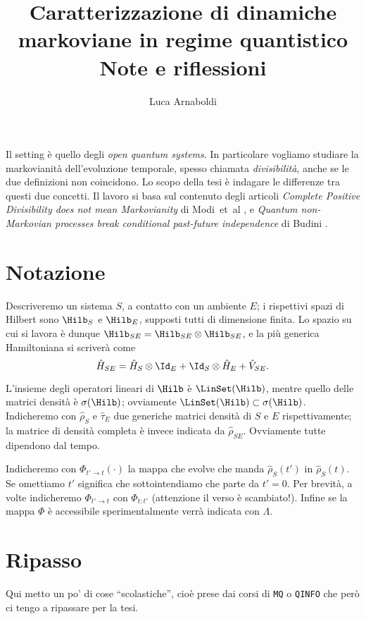 \documentclass[a4]{article}
\title{Caratterizzazione di dinamiche markoviane in regime quantistico \\[1ex]
	   \large{Note e riflessioni}}
\author{Luca Arnaboldi}
\begin{document}
\maketitle
\tableofcontents
\vspace{6pt}
Il setting è quello degli \emph{open quantum systems}. In particolare vogliamo studiare
la markovianità dell'evoluzione temporale, spesso chiamata \emph{divisibilità}, anche se
le due definizioni non coincidono. Lo scopo della tesi è indagare le differenze tra questi
due concetti. Il lavoro si basa sul contenuto degli articoli \emph{Complete Positive
Divisibility does not mean Markovianity} di Modi~et~al \cite{CPdoesnotimply}, e \emph{Quantum non-Markovian processes break conditional past-future independence} di Budini \cite{budini2018quantum}.

\section{Notazione}
Descriveremo un sistema \(S\), a contatto con un ambiente \(E\); i rispettivi spazi di
Hilbert sono \(\Hilb_S\) e \(\Hilb_E\), supposti tutti di dimensione finita. Lo spazio
su cui si lavora è dunque 
\(\Hilb_{SE} = \Hilb_{SE} \otimes \Hilb_{SE}\), e la più generica Hamiltoniana si
scriverà come
\[\hat{H}_{SE} = \hat{H}_S \otimes  \Id_E + \Id_S \otimes  \hat{H}_E + \hat{V}_{SE}.\]

L'insieme degli operatori lineari di \(\Hilb\) è \(\LinSet(\Hilb)\), mentre quello delle
matrici densità è \(\sigma(\Hilb)\); ovviamente \(\LinSet(\Hilb) \subset \sigma(\Hilb)\).
Indicheremo con \(\hat{\rho}_S\) e \(\hat{\tau}_E\) due generiche matrici densità di \(S\)
e \(E\) rispettivamente; la matrice di densità completa è invece indicata da \(\hat{\rho}_{SE}\).
Ovviamente tutte dipendono dal tempo.


Indicheremo con \(\Phi_{t'\to t}(\cdot)\) la mappa che evolve che manda \(\hat{\rho}_S(t')\)
in \(\hat{\rho}_S(t)\). Se omettiamo \(t'\) significa che sottointendiamo che parte da \(t'=0\).
Per brevità, a volte indicheremo \(\Phi_{t'\to t}\) con \(\Phi_{t:t'}\) (attenzione il verso è scambiato!).
Infine se la mappa \(\Phi\) è accessibile sperimentalmente verrà indicata con
\(\Lambda\).

\section{Ripasso}
Qui metto un po' di cose ``scolastiche'', cioè prese dai corsi di \texttt{MQ} o \texttt{QINFO}
che però ci tengo a ripassare per la tesi.
\end{document}
